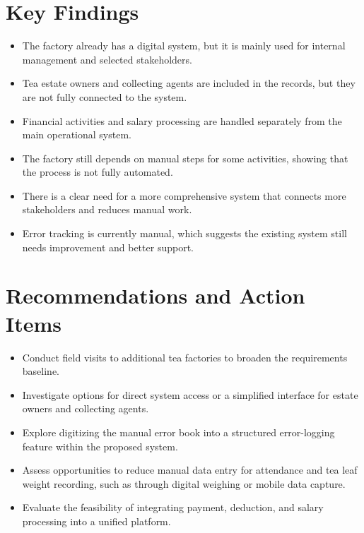 \documentclass[11pt,a4paper]{article}
\begin{document}
\section*{Key Findings}
\begin{itemize}[nosep]
    \item The factory already has a digital system, but it is mainly used for internal management and selected stakeholders.
    \item Tea estate owners and collecting agents are included in the records, but they are not fully connected to the system.
    \item Financial activities and salary processing are handled separately from the main operational system.
    \item The factory still depends on manual steps for some activities, showing that the process is not fully automated.
    \item There is a clear need for a more comprehensive system that connects more stakeholders and reduces manual work.
    \item Error tracking is currently manual, which suggests the existing system still needs improvement and better support.
\end{itemize}

\section*{Recommendations and Action Items}
\begin{itemize}[nosep]
    \item Conduct field visits to additional tea factories to broaden the requirements baseline.
    \item Investigate options for direct system access or a simplified interface for estate owners and collecting agents.
    \item Explore digitizing the manual error book into a structured error-logging feature within the proposed system.
    \item Assess opportunities to reduce manual data entry for attendance and tea leaf weight recording, such as through digital weighing or mobile data capture.
    \item Evaluate the feasibility of integrating payment, deduction, and salary processing into a unified platform.
\end{itemize}
\end{document}
